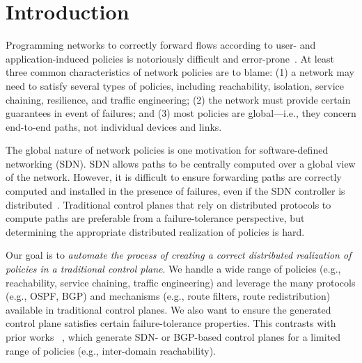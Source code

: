 \section{Introduction}
Programming networks to correctly forward flows according to user- and
application-induced policies is notoriously difficult and
error-prone~\cite{troubleshooting, bgpmisconfig}. At least three common characteristics of
network policies are to blame: (1) a network may need to satisfy several
types of policies, including reachability, isolation, service
chaining, resilience, and traffic engineering; (2) the network
must provide certain guarantees in event of failures; and (3) most policies are global---i.e., they
concern end-to-end paths, not individual devices and links.


The global nature of network policies is one motivation for software-defined
networking (SDN). SDN allows paths to be centrally computed over a global view
of the network. However, it is difficult to ensure forwarding paths are
correctly computed and installed in the presence of failures, even if the SDN
controller is distributed~\cite{hasdn}.
Traditional control planes that rely on distributed protocols to
compute paths are preferable from a failure-tolerance perspective, but
determining the appropriate distributed realization of policies is hard.




Our goal is to {\em automate the process of creating a correct distributed
	realization of policies in a traditional control plane}. We handle
a wide range of policies (e.g., reachability, service chaining, traffic
engineering) and leverage the many protocols (e.g., OSPF, BGP) and mechanisms
(e.g., route filters, route redistribution) available in traditional control
planes. We also want to ensure the generated control plane satisfies
certain failure-tolerance properties. This contrasts with
prior works
~\cite{netegg, propane, merlin,simple,fattire, netkat, netkatcompiler, sol}, which generate SDN- or BGP-based
control planes for a limited range of policies (e.g., inter-domain
reachability).

